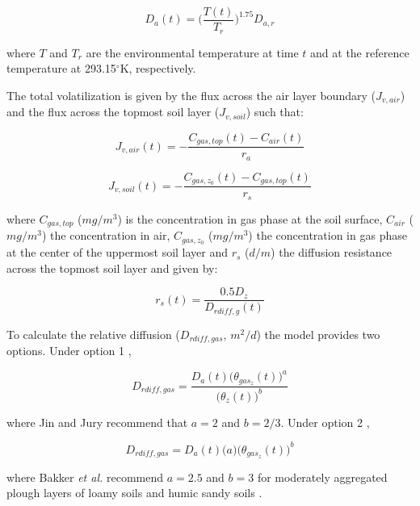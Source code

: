 \documentclass[]{article}
\begin{document}
\begin{equation}
D_a(t) = \Big(\frac{ T(t) }{ T_r } \Big)^{1.75} D_{a,r}
\label{eq:Da}
\end{equation}

where \(T\) and \(T_r\) are the environmental temperature at time \(t\)
and at the reference temperature at 293.15\(^\circ\)K, respectively.

The total volatilization is given by the flux across the air layer
boundary (\(J_{v,air}\)) and the flux across the topmost soil layer
(\(J_{v,soil}\)) such that:

\begin{equation}
J_{v,air}(t) = - \frac{ C_{gas,top}(t) - C_{air}(t) }{ r_a }
\label{eq:Jva}
\end{equation}

\begin{equation}
J_{v,soil}(t) = - \frac{ C_{gas,z_0}(t) - C_{gas,top}(t) }{ r_s }
\label{eq:Jvs}
\end{equation}

where \(C_{gas,top}\) (\(mg/m^3\)) is the concentration in gas phase at
the soil surface, \(C_{air}\) (\(mg/m^3\)) the concentration in air,
\(C_{gas,z_0}\) (\(mg/m^3\)) the concentration in gas phase at the
center of the uppermost soil layer and \(r_s\) (\(d/m\)) the diffusion
resistance across the topmost soil layer and given by:

\begin{equation}
r_s(t)= \frac{ 0.5 D_z }{ D_{rdiff,g}(t) }
\label{eq:resistance_soil}
\end{equation}

To calculate the relative diffusion (\(D_{rdiff,gas}\), \(m^2/d\)) the
model provides two options. Under option 1 \citep{Millington1960},

\begin{equation}
D_{rdiff,gas} = \frac{ D_a(t) \Big(\theta_{gas_z}(t)\Big)^a}{ \Big(\theta_z(t) \Big)^b }
\label{eq:d_rdiff1}
\end{equation}

where Jin and Jury \citeyearpar{Jin1996} recommend that \(a=2\) and
\(b=2/3\). Under option 2 \citep{Currie1960},

\begin{equation}
D_{rdiff,gas} = D_a(t) \Big(a\Big) \Big( \theta_{gas_z}(t)  \Big)^b
\label{eq:d_rdiff2}
\end{equation}

where Bakker \textit{et al.} \citeyearpar{Bakker1987} recommend
\(a=2.5\) and \(b=3\) for moderately aggregated plough layers of loamy
soils and humic sandy soils \citep{Leistra2001}.
\end{document}
